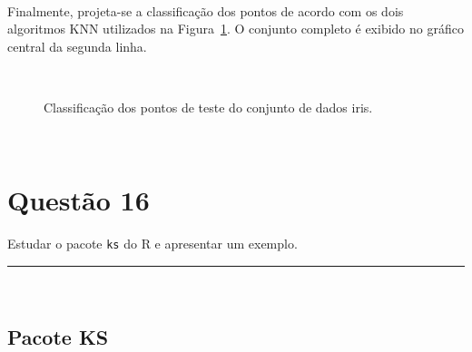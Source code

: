 \documentclass[
  a4paperpaper,
]{article}
\begin{document}
~

Finalmente, projeta-se a classificação dos pontos de acordo com os dois
algoritmos KNN utilizados na Figura~\ref{fig-knniris}. O conjunto
completo é exibido no gráfico central da segunda linha.

~

\begin{figure}[H]


\caption{\label{fig-knniris}Classificação dos pontos de teste do
conjunto de dados iris.}

\end{figure}%

~

\section{Questão 16}\label{questuxe3o-16}

Estudar o pacote \texttt{ks} do R e apresentar um exemplo.

\begin{center}\rule{0.5\linewidth}{0.5pt}\end{center}

~

\subsection{Pacote KS}\label{pacote-ks}
\end{document}
